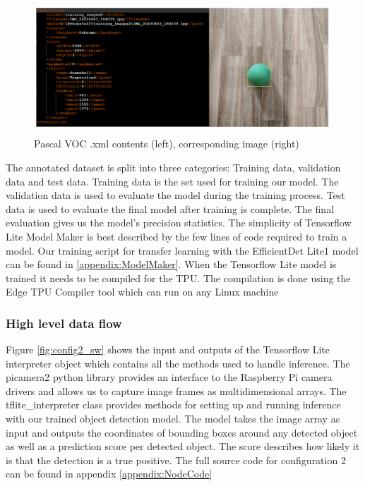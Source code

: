 \begin{figure}[H]
    \centering
    \includegraphics[scale=0.3]{a_martinbilder/pascalvoc_xml.drawio.png}
    \caption{Pascal VOC .xml contents (left), corresponding image (right)}
    \label{fig:pascalvoc}
\end{figure}

The annotated dataset is split into three categories: Training data, validation data and test data. Training data is the set used for training our model. The validation data is used to evaluate the model during the training process. Test data is used to evaluate the final model after training is complete. The final evaluation gives us the model’s precision statistics. The simplicity of Tensorflow Lite Model Maker is best described by the few lines of code required to train a model. Our training script for transfer learning with the EfficientDet Lite1 model can be found in \ref{appendix:ModelMaker}. When the Tensorflow Lite model is trained it needs to be compiled for the TPU. The compilation is done using the Edge TPU Compiler tool which can run on any Linux machine \cite{edgetpuCompiler}


\subsubsection{High level data flow}


Figure \ref{fig:config2_sw} shows the input and outputs of the Tensorflow Lite interpreter object which contains all the methods used to handle inference.
The picamera2 python library provides an interface to the Raspberry Pi camera drivers and allows us to capture image frames as multidimensional arrays. The tflite{\_}interpreter class provides methods for setting up and running inference with our trained object detection model. The model takes the image array as input and outputs the coordinates of bounding boxes around any detected object as well as a prediction score per detected object. The score describes how likely it is that the detection is a true positive. The full source code for configuration 2 can be found in appendix \ref{appendix:NodeCode}\\

